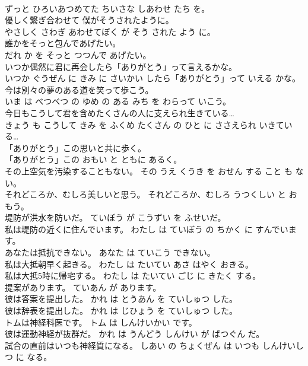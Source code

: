 \documentclass[8pt]{extreport}
\begin{document}
\begin{CJK}{UTF8}{min}
\\	ずっと ひろいあつめてた ちいさな しあわせ たち を。	
\\	優しく繋ぎ合わせて 僕がそうされたように。	
\\	やさしく さわぎ あわせてぼく が そう された よう に。	
\\	誰かをそっと包んであげたい。	
\\	だれ か を そっと つつんで あげたい。	
\\	いつか偶然に君に再会したら「ありがとう」って言えるかな。	
\\	いつか ぐうぜん に きみ に さいかい したら「ありがとう」って いえる かな。	
\\	今は別々の夢のある道を笑って歩こう。	
\\	いま は べつべつ の ゆめ の ある みち を わらって いこう。	
\\	今日もこうして君を含めたくさんの人に支えられ生きている…	
\\	きょう も こうして きみ を ふくめ たくさん の ひと に ささえられ いきている…	
\\	「ありがとう」この思いと共に歩く。	
\\	「ありがとう」この おもい と ともに あるく。	
\\	その上空気を汚染することもない。	その うえ くうき を おせん する こと も ない。	
\\	それどころか、むしろ美しいと思う。	それどころか、むしろ うつくしい と おもう。	
\\	堤防が洪水を防いだ。	ていぼう が こうずい を ふせいだ。	
\\	私は堤防の近くに住んでいます。	わたし は ていぼう の ちかく に すんでいます。	
\\	あなたは抵抗できない。	あなた は ていこう できない。	
\\	私は大抵朝早く起きる。	わたし は たいてい あさ はやく おきる。	
\\	私は大抵5時に帰宅する。	わたし は たいてい ごじ に きたく する。	
\\	提案があります。	ていあん が あります。	
\\	彼は答案を提出した。	かれ は とうあん を ていしゅつ した。	
\\	彼は辞表を提出した。	かれ は じひょう を ていしゅつ した。	
\\	トムは神経科医です。	トム は しんけいかい です。	
\\	彼は運動神経が抜群だ。	かれ は うんどう しんけい が ばつぐん だ。	
\\	試合の直前はいつも神経質になる。	しあい の ちょくぜん は いつも しんけいしつ に なる。	

\end{CJK}
\end{document}

